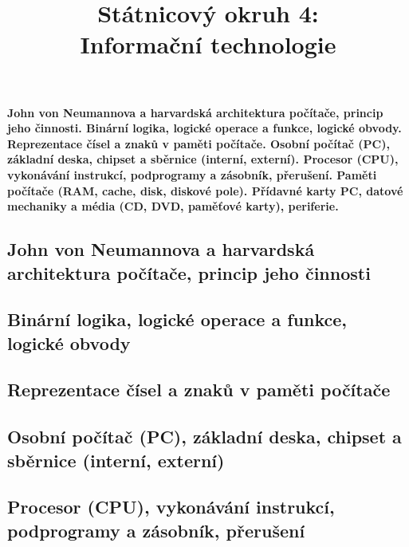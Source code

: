 \documentclass[10pt,a4paper]{article}
\begin{document}
\title{Státnicový okruh 4: \\ Informační technologie}
\maketitle
\newpage
\tableofcontents
\newpage

\section{}
\paragraph{John von Neumannova a harvardská architektura počítače, princip jeho činnosti. Binární logika, logické operace a funkce, logické obvody. Reprezentace čísel a znaků v paměti počítače. Osobní počítač (PC), základní deska, chipset a sběrnice (interní, externí). Procesor (CPU), vykonávání instrukcí, podprogramy a zásobník, přerušení. Paměti počítače (RAM, cache, disk, diskové pole). Přídavné karty PC, datové mechaniky a média (CD, DVD, paměťové karty), periferie.}

\subsection{John von Neumannova a harvardská architektura počítače, princip jeho činnosti}

\subsection{Binární logika, logické operace a funkce, logické obvody}

\subsection{Reprezentace čísel a znaků v paměti počítače}

\subsection{Osobní počítač (PC), základní deska, chipset a sběrnice (interní, externí)}

\subsection{Procesor (CPU), vykonávání instrukcí, podprogramy a zásobník, přerušení}
\end{document}
